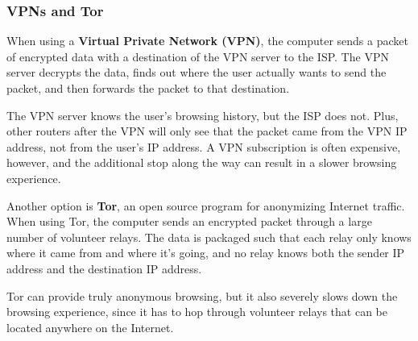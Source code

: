 \documentclass{article}
\newcounter{definition}[section]
\begin{document}
  \subsubsection{VPNs and Tor}
  \begin{definition}
    \label{def:virtual-private-network}
  When using a \textbf{Virtual Private Network (VPN)}, the computer sends a packet of encrypted data with a destination of the VPN server to the ISP. The VPN server decrypts the data, finds out where the user actually wants to send the packet, and then forwards the packet to that destination. 
  \begin{center}
  \end{center}
  The VPN server knows the user's browsing history, but the ISP does not. Plus, other routers after the VPN will only see that the packet came from the VPN IP address, not from the user's IP address. A VPN subscription is often expensive, however, and the additional stop along the way can result in a slower browsing experience. 
  \end{definition}

  Another option is \textbf{Tor}, an open source program for anonymizing Internet traffic.  When using Tor, the computer sends an encrypted packet through a large number of volunteer relays. The data is packaged such that each relay only knows where it came from and where it's going, and no relay knows both the sender IP address and the destination IP address. 
   
  Tor can provide truly anonymous browsing, but it also severely slows down the browsing experience, since it has to hop through volunteer relays that can be located anywhere on the Internet. 
\end{document}
